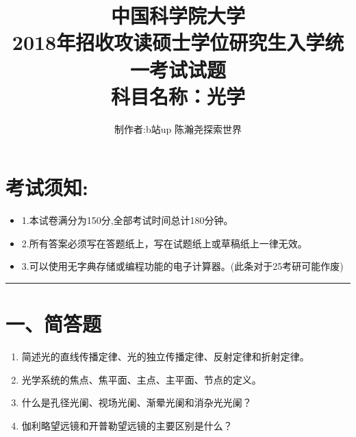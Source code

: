 \documentclass[11pt,a4paper]{article}
\begin{document}
    \title{中国科学院大学\\2018年招收攻读硕士学位研究生入学统一考试试题\\科目名称：光学}
    \author{制作者:b站up 陈瀚尧探索世界}
    \date{}
    \maketitle
    \titleformat{\section}[block]{\normalfont\Large\bfseries}{}{0pt}{}


    \section{考试须知:}
    \begin{itemize}[topsep=0pt,itemsep=0pt,partopsep=0pt]
        \item 1.本试卷满分为150分,全部考试时间总计180分钟。
        \vspace{-3mm}
        \item 2.所有答案必须写在答题纸上，写在试题纸上或草稿纸上一律无效。
        \vspace{-3mm}
        \item 3.可以使用无字典存储或编程功能的电子计算器。(此条对于25考研可能作废)
    \end{itemize}
    \vspace{-5mm}
    \noindent\rule{\textwidth}{0.5pt} %
    \vspace{-12mm}
    \section*{一、简答题}
    \begin{enumerate}
        \vspace{0mm}
        \item 简述光的直线传播定律、光的独立传播定律、反射定律和折射定律。
        \vspace{5mm}
        \item 光学系统的焦点、焦平面、主点、主平面、节点的定义。
        \vspace{5mm}
        \item 什么是孔径光阑、视场光阑、渐晕光阑和消杂光光阑？
        \vspace{5mm}
        \item 伽利略望远镜和开普勒望远镜的主要区别是什么？
        \vspace{5mm}
    \end{enumerate}
\end{document}
